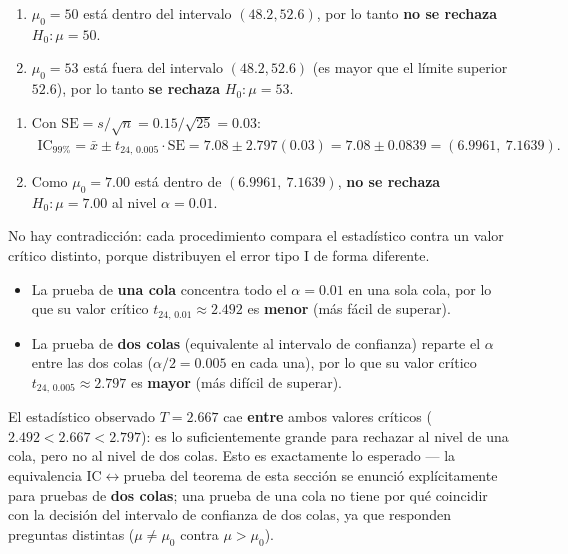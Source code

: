 \begin{solproblema}[prob:ae1a813]
	\begin{enumerate}
		\item $\mu_0 = 50$ está dentro del intervalo $(48.2, 52.6)$, por lo tanto \textbf{no se rechaza} $H_0: \mu = 50$.
		\item $\mu_0 = 53$ está fuera del intervalo $(48.2, 52.6)$ (es mayor que el límite superior $52.6$), por lo tanto \textbf{se rechaza} $H_0: \mu = 53$.
	\end{enumerate}
\end{solproblema}

\begin{solproblema}[prob:1b375b0]
	\begin{enumerate}
		\item Con $\text{SE} = s/\sqrt{n} = 0.15/\sqrt{25} = 0.03$:
		\begin{align}
			\text{IC}_{99\%} = \bar{x} \pm t_{24,\,0.005} \cdot \text{SE} = 7.08 \pm 2.797(0.03) = 7.08 \pm 0.0839 = (6.9961,\ 7.1639).
		\end{align}
		\item Como $\mu_0 = 7.00$ está dentro de $(6.9961,\ 7.1639)$, \textbf{no se rechaza} $H_0: \mu = 7.00$ al nivel $\alpha = 0.01$.
	\end{enumerate}
\end{solproblema}

\begin{solproblema}[prob:6517bf1]
	No hay contradicción: cada procedimiento compara el estadístico contra un valor crítico distinto, porque distribuyen el error tipo I de forma diferente.
	\begin{itemize}
		\item La prueba de \textbf{una cola} concentra todo el $\alpha = 0.01$ en una sola cola, por lo que su valor crítico $t_{24,\,0.01} \approx 2.492$ es \textbf{menor} (más fácil de superar).
		\item La prueba de \textbf{dos colas} (equivalente al intervalo de confianza) reparte el $\alpha$ entre las dos colas ($\alpha/2 = 0.005$ en cada una), por lo que su valor crítico $t_{24,\,0.005} \approx 2.797$ es \textbf{mayor} (más difícil de superar).
	\end{itemize}
	El estadístico observado $T = 2.667$ cae \textbf{entre} ambos valores críticos ($2.492 < 2.667 < 2.797$): es lo suficientemente grande para rechazar al nivel de una cola, pero no al nivel de dos colas. Esto es exactamente lo esperado — la equivalencia IC$\leftrightarrow$prueba del teorema de esta sección se enunció explícitamente para pruebas de \textbf{dos colas}; una prueba de una cola no tiene por qué coincidir con la decisión del intervalo de confianza de dos colas, ya que responden preguntas distintas ($\mu \neq \mu_0$ contra $\mu > \mu_0$).
\end{solproblema}

